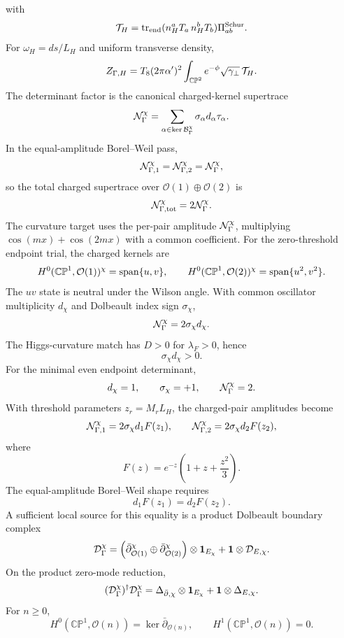 \documentclass[11pt]{article}
\theoremstyle{definition}
\theoremstyle{remark}
\newcommand{\CP}{\mathbb{CP}}
\newcommand{\cO}{\mathcal O}
\begin{document}
with
\[
  {\cal T}_H=
  {\rm tr}_{\rm end}(n_H^aT_a\,n_H^bT_b)\Pi_{ab}^{\rm Schur}.
\]
For \(\omega_H=ds/L_H\) and uniform transverse density,
\[
  Z_{\Gamma,H}
  =
  T_8(2\pi\alpha')^2
  \int_{\CP^2}
  e^{-\phi}\sqrt{\gamma_\perp}\,
  {\cal T}_H .
\]
The determinant factor is the canonical charged-kernel supertrace
\[
  {\cal N}_\Gamma^\chi
  =
  \sum_{\alpha\in\ker{\cal B}_\Gamma^\chi}
  \sigma_\alpha d_\alpha\tau_\alpha .
\]
In the equal-amplitude Borel--Weil pass,
\[
  {\cal N}_{\Gamma,1}^\chi
  =
  {\cal N}_{\Gamma,2}^\chi
  =
  {\cal N}_\Gamma^\chi ,
\]
so the total charged supertrace over
\(\cO(1)\oplus\cO(2)\) is
\[
  {\cal N}_{\Gamma,{\rm tot}}^\chi
  =
  2{\cal N}_\Gamma^\chi .
\]
The curvature target uses the per-pair amplitude
\({\cal N}_\Gamma^\chi\), multiplying
\(\cos(mx)+\cos(2mx)\) with a common coefficient.
For the zero-threshold endpoint trial, the charged kernels are
\[
  H^0(\CP^1,\cO(1))^\chi={\rm span}\{u,v\},
  \qquad
  H^0(\CP^1,\cO(2))^\chi={\rm span}\{u^2,v^2\}.
\]
The \(uv\) state is neutral under the Wilson angle.  With common oscillator
multiplicity \(d_\chi\) and Dolbeault index sign \(\sigma_\chi\),
\[
  {\cal N}_\Gamma^\chi=2\sigma_\chi d_\chi .
\]
The Higgs-curvature match has \(D>0\) for \(\lambda_F>0\), hence
\[
  \sigma_\chi d_\chi>0 .
\]
For the minimal even endpoint determinant,
\[
  d_\chi=1,\qquad
  \sigma_\chi=+1,\qquad
  {\cal N}_\Gamma^\chi=2 .
\]
With threshold parameters \(z_r=M_rL_H\), the charged-pair amplitudes become
\[
  {\cal N}_{\Gamma,1}^\chi
  =
  2\sigma_\chi d_1F(z_1),
  \qquad
  {\cal N}_{\Gamma,2}^\chi
  =
  2\sigma_\chi d_2F(z_2),
\]
where
\[
  F(z)=e^{-z}\left(1+z+\frac{z^2}{3}\right).
\]
The equal-amplitude Borel--Weil shape requires
\[
  d_1F(z_1)=d_2F(z_2).
\]
A sufficient local source for this equality is a product Dolbeault boundary
complex
\[
  {\cal D}_\Gamma^\chi
  =
  \left(
  \bar\partial_{\cO(1)}^\chi
  \oplus
  \bar\partial_{\cO(2)}^\chi
  \right)\otimes{\bf 1}_{E_\chi}
  +
  {\bf 1}\otimes{\cal D}_{E,\chi}.
\]
On the product zero-mode reduction,
\[
  ({\cal D}_\Gamma^\chi)^\dagger{\cal D}_\Gamma^\chi
  =
  \Delta_{\bar\partial,\chi}\otimes{\bf 1}_{E_\chi}
  +
  {\bf 1}\otimes\Delta_{E,\chi}.
\]
For \(n\geq0\),
\[
  H^0(\CP^1,\cO(n))=\ker\bar\partial_{\cO(n)},
  \qquad
  H^1(\CP^1,\cO(n))=0 .
\]
\end{document}
